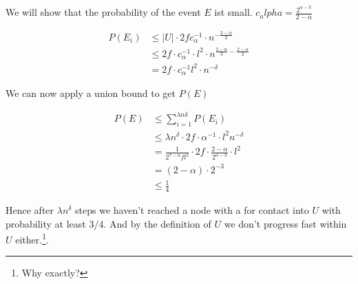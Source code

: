 \begin{pr}
We will show that the probability of the event $E$ ist small. $c_alpha = \frac{2^{\alpha-3}}{2-\alpha}$

\begin{align*}
P(E_i) &\leq |U| \cdot 2fc_\alpha^{-1} \cdot n^{-\frac{2-\alpha}{2}}\\
	&\leq 2f\cdot c_\alpha^{-1} \cdot l^2 \cdot n^{\frac{2-\alpha}{3} -\frac{2-\alpha}{2}}\\
	&=2f\cdot c_\alpha ^{-1} l^2 \cdot n^{-\delta}
\end{align*}

We can now apply a union bound to get $P(E)$

\begin{align*}
P(E) &\leq\sum_{i=1}^{\lambda n\delta} P(E_i)\\
	&\leq  \lambda n^\delta \cdot 2f\cdot \alpha^{-1} \cdot l^2 n^{-\delta}\\
	&= \frac{1}{2^{7-\alpha} fl^2} \cdot 2f\cdot \frac{2-\alpha}{2^{\alpha-3}} \cdot l^2\\
	&=(2-\alpha)\cdot 2^{-3}\\
	&\leq \frac{1}{4}
\end{align*}

Hence after $\lambda n^\delta$ steps we haven't reached a node with a for contact into $U$ with probability at least $3/4$. And by the definition of $U$ we don't progress fast within $U$ either.\footnote{Why exactly?}.
\end{pr}

